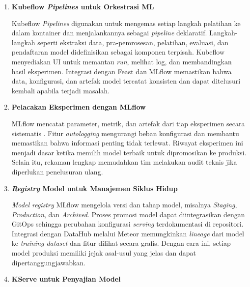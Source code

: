 \vspace{0.5em}
\begin{enumerate}
    \item \textbf{Kubeflow \textit{Pipelines} untuk Orkestrasi ML}  

    Kubeflow \textit{Pipelines} digunakan untuk mengemas setiap langkah pelatihan ke dalam kontainer dan menjalankannya sebagai \textit{pipeline} deklaratif. Langkah-langkah seperti ekstraksi data, pra-pemrosesan, pelatihan, evaluasi, dan pendaftaran model didefinisikan sebagai komponen terpisah. Kubeflow menyediakan UI untuk memantau \textit{run}, melihat log, dan membandingkan hasil eksperimen. Integrasi dengan Feast dan MLflow memastikan bahwa data, konfigurasi, dan artefak model tercatat konsisten dan dapat ditelusuri kembali apabila terjadi masalah.

    \vspace{0.5em}

    \item \textbf{Pelacakan Eksperimen dengan MLflow}  

    MLflow mencatat parameter, metrik, dan artefak dari tiap eksperimen secara sistematis \autocite{pimentel2019notebooks}. Fitur \textit{autologging} mengurangi beban konfigurasi dan membantu memastikan bahwa informasi penting tidak terlewat. Riwayat eksperimen ini menjadi dasar ketika memilih model terbaik untuk dipromosikan ke produksi. Selain itu, rekaman lengkap memudahkan tim melakukan audit teknis jika diperlukan penelusuran ulang.

    \vspace{0.5em}

    \item \textbf{\textit{Registry} Model untuk Manajemen Siklus Hidup}  

    \textit{Model registry} MLflow mengelola versi dan tahap model, misalnya \textit{Staging}, \textit{Production}, dan \textit{Archived}. Proses promosi model dapat diintegrasikan dengan GitOps sehingga perubahan konfigurasi \textit{serving} terdokumentasi di repositori. Integrasi dengan DataHub melalui Meteor memungkinkan \textit{lineage} dari model ke \textit{training dataset} dan fitur dilihat secara grafis. Dengan cara ini, setiap model produksi memiliki jejak asal-usul yang jelas dan dapat dipertanggungjawabkan.

    \vspace{0.5em}

    \item \textbf{KServe untuk Penyajian Model}  


\end{enumerate}
